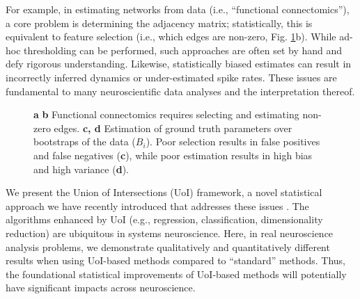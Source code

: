 \documentclass[letterpaper, 10 pt, conference]{ieeeconf}  %
\begin{document}
For example, in estimating networks from data (i.e., ``functional connectomics''), a core problem is determining the adjacency matrix; statistically, this is equivalent to feature selection (i.e., which edges are non-zero, Fig.  \ref{fig:intro}b). While ad-hoc thresholding can be performed, such approaches are often set by hand and defy rigorous understanding. Likewise, statistically biased estimates can result in incorrectly inferred dynamics or under-estimated spike rates. These issues are fundamental to many neuroscientific data analyses and the interpretation thereof.

\begin{figure}[b!]
    \vspace{-20pt}
    \centering
    \caption{\textbf{a} \textbf{b} Functional connectomics requires selecting and estimating non-zero edges. \textbf{c, d} Estimation of ground truth parameters over bootstraps of the data ($B_i$). Poor selection results in false positives and false negatives (\textbf{c}), while poor estimation results in high bias and high variance (\textbf{d}).}
    \label{fig:intro}
\end{figure}

We present the Union of Intersections (UoI) framework, a novel statistical approach we have recently introduced that addresses these issues \cite{uoi}. The algorithms enhanced by UoI (e.g., regression, classification, dimensionality reduction) are ubiquitous in systems neuroscience. Here, in real neuroscience analysis problems, we demonstrate qualitatively and quantitatively different results when using UoI-based methods compared to ``standard'' methods.  Thus, the foundational statistical improvements of UoI-based methods will potentially have significant impacts across neuroscience.
\end{document}
